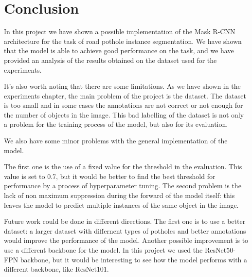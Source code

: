 \chapter*{Conclusion} %

In this project we have shown a possible implementation of the Mask R-CNN architecture for the task of road pothole instance segmentation. We have shown that the model is able to achieve good performance on the task, and we have provided an analysis of the results obtained on the dataset used for the experiments. 

It's also worth noting that there are some limitations.
As we have shown in the experiments chapter, the main problem of the project is the dataset. The dataset is too small and in some cases the annotations are not correct or not enough for the number of objects in the image. 
This bad labelling of the dataset is not only a problem for the training process of the model, but also for its evaluation. 

We also have some minor problems with the general implementation of the model. 

The first one is the use of a fixed value for the threshold in the evaluation. This value is set to 0.7, but it would be better to find the best threshold for performance by a process of hyperparameter tuning. 
The second problem is the lack of non maximum suppression during the forward of the model itself: this leaves the model to predict multiple instances of the same object in the image.

Future work could be done in different directions. The first one is to use a better dataset: a larger dataset with differnent types of potholes and better annotations would improve the performance of the model.
Another possible improvement is to use a different backbone for the model. In this project we used the ResNet50-FPN backbone, but it would be interesting to see how the model performs with a different backbone, like ResNet101.
